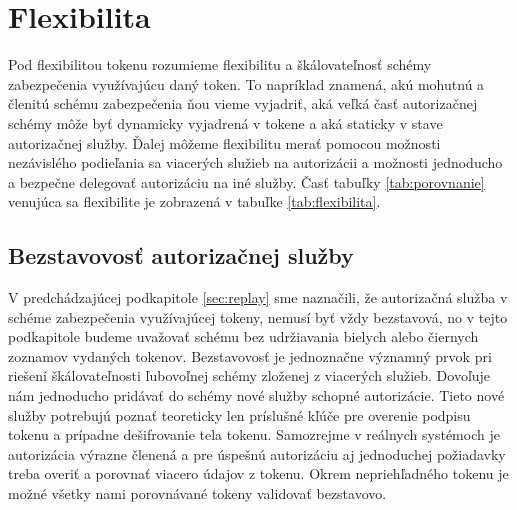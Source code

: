 \section{Flexibilita}

Pod flexibilitou tokenu rozumieme flexibilitu a škálovateľnosť schémy zabezpečenia využívajúcu daný token. To napríklad znamená, akú mohutnú a členitú schému zabezpečenia ňou vieme vyjadriť, aká veľká časť autorizačnej schémy môže byť dynamicky vyjadrená v tokene a aká staticky v stave autorizačnej služby. Ďalej môžeme flexibilitu merať pomocou možnosti nezávislého podieľania sa viacerých služieb na autorizácii a možnosti jednoducho a bezpečne delegovať autorizáciu na iné služby. Časť tabuľky \ref{tab:porovnanie} venujúca sa flexibilite je zobrazená v tabuľke \ref{tab:flexibilita}.

\begin{table}
  \begin{center}
    \caption{Flexibilita tokenov}
    \label{tab:flexibilita} %

  \end{center}
\end{table}

\subsection{Bezstavovosť autorizačnej služby}

V predchádzajúcej podkapitole \ref{sec:replay} sme naznačili, že autorizačná služba v schéme zabezpečenia využívajúcej tokeny, nemusí byť vždy bezstavová, no v tejto podkapitole budeme uvažovať schému bez udržiavania bielych alebo čiernych zoznamov vydaných tokenov. Bezstavovosť je jednoznačne významný prvok pri riešení škálovateľnosti ľubovoľnej schémy zloženej z viacerých služieb. Dovoľuje nám jednoducho pridávať do schémy nové služby schopné autorizácie. Tieto nové služby potrebujú poznať teoreticky len príslušné kľúče pre overenie podpisu tokenu a prípadne dešifrovanie tela tokenu. Samozrejme v reálnych systémoch je autorizácia výrazne členená a pre úspešnú autorizáciu aj jednoduchej požiadavky treba overiť a porovnať viacero údajov z tokenu. Okrem nepriehľadného tokenu je možné všetky nami porovnávané tokeny validovať bezstavovo.

